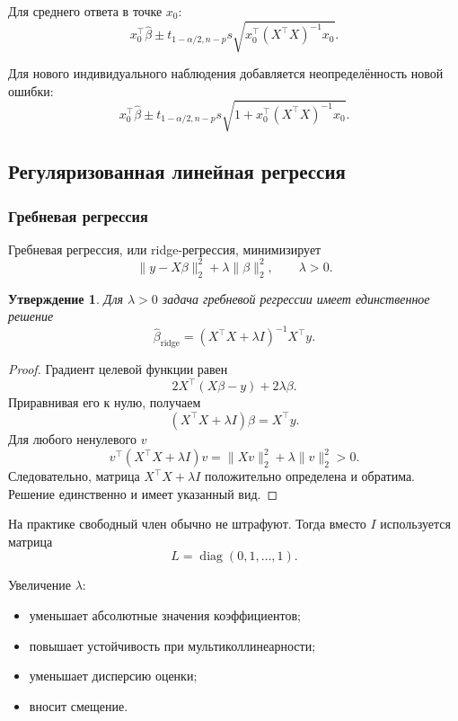 \documentclass[12pt,a4paper]{article}
\newtheorem{proposition}[theorem]{Утверждение}
\theoremstyle{definition}
\theoremstyle{remark}
\newcommand{\diag}{\operatorname{diag}}
\begin{document}
Для среднего ответа в точке $x_0$:
\[
    x_0^\top\widehat\beta
    \pm
    t_{1-\alpha/2,n-p}
    s\sqrt{
        x_0^\top(X^\top X)^{-1}x_0
    }.
\]

Для нового индивидуального наблюдения добавляется неопределённость новой
ошибки:
\[
    x_0^\top\widehat\beta
    \pm
    t_{1-\alpha/2,n-p}
    s\sqrt{
        1+x_0^\top(X^\top X)^{-1}x_0
    }.
\]

\subsection{Регуляризованная линейная регрессия}

\subsubsection{Гребневая регрессия}

Гребневая регрессия, или ridge-регрессия, минимизирует
\[
    \|y-X\beta\|_2^2+\lambda\|\beta\|_2^2,
    \qquad \lambda>0.
\]

\begin{proposition}
Для $\lambda>0$ задача гребневой регрессии имеет единственное решение
\[
    \boxed{
    \widehat\beta_{\mathrm{ridge}}
    =
    (X^\top X+\lambda I)^{-1}X^\top y
    }.
\]
\end{proposition}

\begin{proof}
Градиент целевой функции равен
\[
    2X^\top(X\beta-y)+2\lambda\beta.
\]
Приравнивая его к нулю, получаем
\[
    (X^\top X+\lambda I)\beta=X^\top y.
\]
Для любого ненулевого $v$
\[
    v^\top(X^\top X+\lambda I)v
    =
    \|Xv\|_2^2+\lambda\|v\|_2^2>0.
\]
Следовательно, матрица $X^\top X+\lambda I$ положительно определена и
обратима. Решение единственно и имеет указанный вид.
\end{proof}

На практике свободный член обычно не штрафуют. Тогда вместо $I$ используется
матрица
\[
    L=\diag(0,1,\ldots,1).
\]

Увеличение $\lambda$:

\begin{itemize}
    \item уменьшает абсолютные значения коэффициентов;
    \item повышает устойчивость при мультиколлинеарности;
    \item уменьшает дисперсию оценки;
    \item вносит смещение.
\end{itemize}
\end{document}
